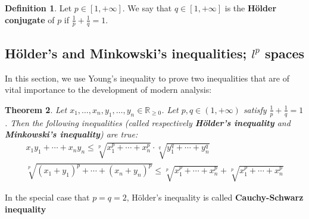 \documentclass[12pt,b5paper,notitlepage]{article}
\theoremstyle{definition}
\newtheorem{df}{Definition}[section]
\theoremstyle{plain}
\newtheorem{thm}[df]{Theorem}
\newcommand{\Rbb}{\mathbb R}
\numberwithin{equation}{section}
\begin{document}
\begin{df}
Let $p\in[1,+\infty]$. We say that $q\in[1,+\infty]$ is the \textbf{H\"older conjugate}  of $p$ if $\frac 1p+\frac 1q=1$.
\end{df}



\subsection{H\"older's and Minkowski's inequalities; $l^p$ spaces}



In this section, we use Young's inequality to prove two inequalities that are of vital importance to the development of modern analysis:





\begin{thm}
Let $x_1,\dots,x_n,y_1,\dots,y_n\in\Rbb_{\geq0}$. Let $p,q\in(1,+\infty)$ satisfy $\frac 1p+\frac 1q=1$. Then the following inequalities (called respectively \textbf{H\"older's inequality}  and  \textbf{Minkowski's inequality}) are true:
\begin{subequations}
\begin{gather}
x_1y_1+\cdots+x_ny_n\leq\sqrt[p]{x_1^p+\cdots+x_n^p}\cdot\sqrt[q]{y_1^q+\cdots+y_n^q}\\
\sqrt[p]{(x_1+y_1)^p+\cdots+(x_n+y_n)^p}\leq  \sqrt[p]{x_1^p+\cdots+x_n^p}+\sqrt[p]{x_1^p+\cdots+x_n^p}
\end{gather}
\end{subequations}
\end{thm}


In the special case that $p=q=2$, H\"older's inequality is called \textbf{Cauchy-Schwarz inequality}
\end{document}
